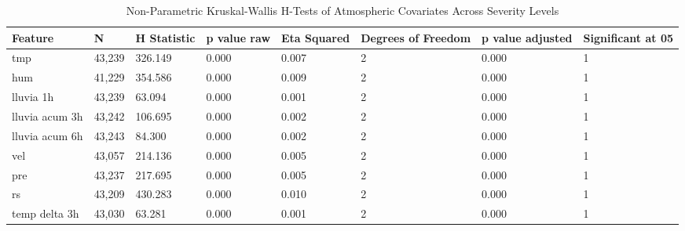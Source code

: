 \begin{table}[htbp]
\centering
\caption{Non-Parametric Kruskal-Wallis H-Tests of Atmospheric Covariates Across Severity Levels}
\label{tab:kruskal_wallis}
\begin{tabular}{llllllll}
\toprule
\textbf{Feature} & \textbf{N} & \textbf{H Statistic} & \textbf{p value raw} & \textbf{Eta Squared} & \textbf{Degrees of Freedom} & \textbf{p value adjusted} & \textbf{Significant at 05} \\
\midrule
tmp & 43,239 & 326.149 & 0.000 & 0.007 & 2 & 0.000 & 1 \\
hum & 41,229 & 354.586 & 0.000 & 0.009 & 2 & 0.000 & 1 \\
lluvia 1h & 43,239 & 63.094 & 0.000 & 0.001 & 2 & 0.000 & 1 \\
lluvia acum 3h & 43,242 & 106.695 & 0.000 & 0.002 & 2 & 0.000 & 1 \\
lluvia acum 6h & 43,243 & 84.300 & 0.000 & 0.002 & 2 & 0.000 & 1 \\
vel & 43,057 & 214.136 & 0.000 & 0.005 & 2 & 0.000 & 1 \\
pre & 43,237 & 217.695 & 0.000 & 0.005 & 2 & 0.000 & 1 \\
rs & 43,209 & 430.283 & 0.000 & 0.010 & 2 & 0.000 & 1 \\
temp delta 3h & 43,030 & 63.281 & 0.000 & 0.001 & 2 & 0.000 & 1 \\
\bottomrule
\end{tabular}
\end{table}